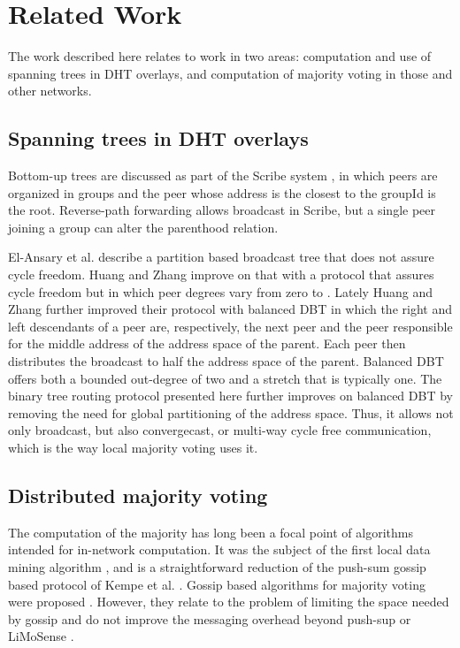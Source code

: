 \documentclass[12pt,english,journal]{elsarticle}
\numberwithin{equation}{section}
\numberwithin{figure}{section}
\theoremstyle{plain}
\theoremstyle{plain}
\begin{document}
\section{\label{sec:Related-Work}Related Work}

The work described here relates to work in two areas: computation
and use of spanning trees in DHT overlays, and computation of majority
voting in those and other networks.


\subsection{Spanning trees in DHT overlays}

Bottom-up trees are discussed as part of the Scribe system \citep{Scribe},
in which peers are organized in groups and the peer whose address
is the closest to the groupId is the root. Reverse-path forwarding
allows broadcast in Scribe, but a single peer joining a group can
alter the parenthood relation. 

El-Ansary et al. \citep{DHTTree1} describe a partition based broadcast
tree that does not assure cycle freedom. Huang and Zhang \citep{dhttreeJ}
improve on that with a protocol that assures cycle freedom but in
which peer degrees vary from zero to . Lately Huang and Zhang
\citep{DHTTree2} further improved their protocol with balanced DBT
in which the right and left descendants of a peer are, respectively,
the next peer and the peer responsible for the middle address of the
address space of the parent. Each peer then distributes the broadcast
to half the address space of the parent. Balanced DBT offers both
a bounded out-degree of two and a stretch that is typically one. The
binary tree routing protocol presented here further improves on balanced
DBT by removing the need for global partitioning of the address space.
Thus, it allows not only broadcast, but also convergecast, or multi-way
cycle free communication, which is the way local majority voting uses
it.


\subsection{Distributed majority voting}

The computation of the majority has long been a focal point of algorithms
intended for in-network computation. It was the subject of the first
local data mining algorithm \citep{MajorityRulej}, and is a straightforward
reduction of the push-sum gossip based protocol of Kempe et al. \citep{KempeGossip}.
Gossip based algorithms for majority voting were proposed \citep{GossipMajority,GossipVoting}.
However, they relate to the problem of limiting the space needed by
gossip and do not improve the messaging overhead beyond push-sup or
LiMoSense \citep{dynamicGossip}. 
\end{document}
